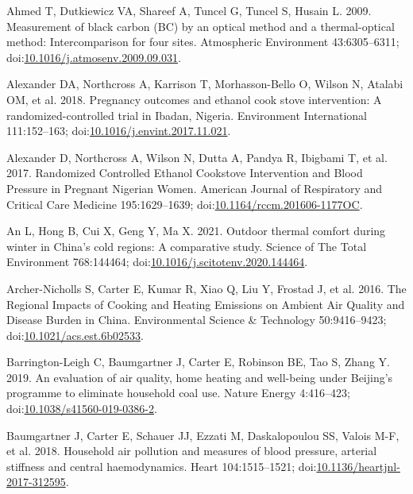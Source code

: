 \documentclass[
  letterpaper,
  DIV=11,
  numbers=noendperiod]{scrartcl}
\newlength{\cslhangindent}
\newlength{\cslentryspacingunit} %
\newenvironment{CSLReferences}[2] %
 {%
  \setlength{\parindent}{0pt}
  \ifodd #1
  \let\oldpar\par
  \def\par{\hangindent=\cslhangindent\oldpar}
  \fi
  \setlength{\parskip}{#2\cslentryspacingunit}
 }%
 {}
\begin{document}
\hypertarget{refs}{}
\begin{CSLReferences}{1}{0}
\leavevmode{}%
Ahmed T, Dutkiewicz VA, Shareef A, Tuncel G, Tuncel S, Husain L. 2009.
Measurement of black carbon ({BC}) by an optical method and a
thermal-optical method: {Intercomparison} for four sites. Atmospheric
Environment 43:6305--6311;
doi:\href{https://doi.org/10.1016/j.atmosenv.2009.09.031}{10.1016/j.atmosenv.2009.09.031}.

\leavevmode{}%
Alexander DA, Northcross A, Karrison T, Morhasson-Bello O, Wilson N,
Atalabi OM, et al. 2018. Pregnancy outcomes and ethanol cook stove
intervention: {A} randomized-controlled trial in {Ibadan}, {Nigeria}.
Environment International 111:152--163;
doi:\href{https://doi.org/10.1016/j.envint.2017.11.021}{10.1016/j.envint.2017.11.021}.

\leavevmode{}%
Alexander D, Northcross A, Wilson N, Dutta A, Pandya R, Ibigbami T, et
al. 2017. Randomized {Controlled Ethanol Cookstove Intervention} and
{Blood Pressure} in {Pregnant Nigerian Women}. American Journal of
Respiratory and Critical Care Medicine 195:1629--1639;
doi:\href{https://doi.org/10.1164/rccm.201606-1177OC}{10.1164/rccm.201606-1177OC}.

\leavevmode{}%
An L, Hong B, Cui X, Geng Y, Ma X. 2021. Outdoor thermal comfort during
winter in {China}'s cold regions: {A} comparative study. Science of The
Total Environment 768:144464;
doi:\href{https://doi.org/10.1016/j.scitotenv.2020.144464}{10.1016/j.scitotenv.2020.144464}.

\leavevmode{}%
Archer-Nicholls S, Carter E, Kumar R, Xiao Q, Liu Y, Frostad J, et al.
2016. The {Regional Impacts} of {Cooking} and {Heating Emissions} on
{Ambient Air Quality} and {Disease Burden} in {China}. Environmental
Science \& Technology 50:9416--9423;
doi:\href{https://doi.org/10.1021/acs.est.6b02533}{10.1021/acs.est.6b02533}.

\leavevmode{}%
Barrington-Leigh C, Baumgartner J, Carter E, Robinson BE, Tao S, Zhang
Y. 2019. An evaluation of air quality, home heating and well-being under
{Beijing}'s programme to eliminate household coal use. Nature Energy
4:416--423;
doi:\href{https://doi.org/10.1038/s41560-019-0386-2}{10.1038/s41560-019-0386-2}.

\leavevmode{}%
Baumgartner J, Carter E, Schauer JJ, Ezzati M, Daskalopoulou SS, Valois
M-F, et al. 2018. Household air pollution and measures of blood
pressure, arterial stiffness and central haemodynamics. Heart
104:1515--1521;
doi:\href{https://doi.org/10.1136/heartjnl-2017-312595}{10.1136/heartjnl-2017-312595}.


\end{CSLReferences}
\end{document}
